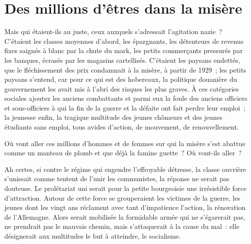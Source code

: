 \documentclass[french,twoside]{book} %
\begin{document}
\section[{Des millions d’êtres dans la misère}]{Des millions d’êtres dans la misère}
\noindent Mais qui étaient-ils au juste, ceux auxquels s’adressait l’agitation nazie ? C’étaient les classes moyennes d’abord, les épargnants, les détenteurs de revenus fixes saignés à blanc par la chute du mark, les petits commerçants pressurés par les banques, écrasés par les magasins cartellisés. C’étaient les paysans endettés, que le fléchissement des prix condamnait à la misère, à partir de 1929 ; les petits paysans s’entend, car pour ce qui est des hobereaux, la politique douanière du gouvernement les avait mis à l’abri des risques les plus graves. À ces catégories sociales ajoutez les anciens combattants et parmi eux la foule des anciens officiers et sous-officiers à qui la fin de la guerre et la défaite ont fait perdre leur emploi ; la jeunesse enfin, la tragique multitude des jeunes chômeurs et des jeunes étudiants sans emploi, tous avides d’action, de mouvement, de renouvellement.\par
Où vont aller ces millions d’hommes et de femmes sur qui la misère s’est abattue comme un manteau de plomb et que déjà la famine guette ? Où vont-ils aller ?\par
Ah certes, si contre le régime qui engendre l’effroyable détresse, la classe ouvrière s’unissait comme tentent de l’unir les communistes, la réponse ne serait pas douteuse. Le prolétariat uni serait pour la petite bourgeoisie une irrésistible force d’attraction. Autour de cette force se grouperaient les victimes de la guerre, les jeunes dont les vingt ans réclament avec tant d’impatience l’action, la rénovation de l’Allemagne. Alors serait mobilisée la formidable armée qui ne s’égarerait pas, ne prendrait pas le mauvais chemin, mais s’attaquerait à la cause du mal : elle désignerait aux multitudes le but à atteindre, le socialisme.
\end{document}
